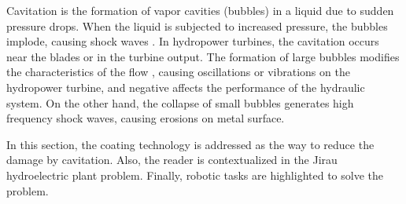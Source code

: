 Cavitation is the formation of vapor cavities (bubbles) in a liquid due to
sudden pressure drops. When the liquid is subjected to increased pressure,
the bubbles implode, causing shock waves \citep{brennen2013cavitation}. 
In hydropower turbines, the cavitation occurs near the blades or
in the turbine output.%
The formation of large bubbles modifies the
characteristics of the flow , causing oscillations or vibrations on the
hydropower turbine, and negative affects the performance of the hydraulic
system. On the other hand, the collapse of small bubbles generates high
frequency shock waves, causing erosions on metal surface.


In this section, the coating technology is addressed as the way to
reduce the damage by cavitation. Also, the reader is contextualized in
the Jirau hydroelectric plant problem. Finally,  robotic tasks are highlighted to
solve the problem.

